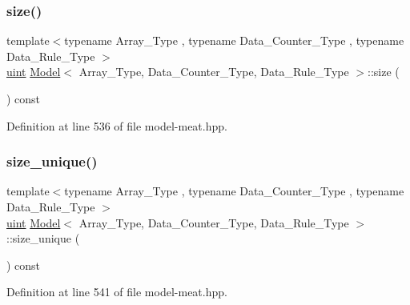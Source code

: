 \mbox{\label{class_model_ab3f157dbb542a48fe5bf412ff7d467fd}} 
\subsubsection{\texorpdfstring{size()}{size()}}
{\footnotesize\ttfamily template$<$typename Array\+\_\+\+Type , typename Data\+\_\+\+Counter\+\_\+\+Type , typename Data\+\_\+\+Rule\+\_\+\+Type $>$ \\
\hyperlink{typedefs_8hpp_a91ad9478d81a7aaf2593e8d9c3d06a14}{uint} \hyperlink{class_model}{Model}$<$ Array\+\_\+\+Type, Data\+\_\+\+Counter\+\_\+\+Type, Data\+\_\+\+Rule\+\_\+\+Type $>$\+::size (\begin{DoxyParamCaption}{ }\end{DoxyParamCaption}) const\hspace{0.3cm}{\ttfamily [inline]}}



Definition at line 536 of file model-\/meat.\+hpp.

\mbox{\label{class_model_a4b5edbe891b6da2319ea3fa6f1aba11d}} 
\subsubsection{\texorpdfstring{size\+\_\+unique()}{size\_unique()}}
{\footnotesize\ttfamily template$<$typename Array\+\_\+\+Type , typename Data\+\_\+\+Counter\+\_\+\+Type , typename Data\+\_\+\+Rule\+\_\+\+Type $>$ \\
\hyperlink{typedefs_8hpp_a91ad9478d81a7aaf2593e8d9c3d06a14}{uint} \hyperlink{class_model}{Model}$<$ Array\+\_\+\+Type, Data\+\_\+\+Counter\+\_\+\+Type, Data\+\_\+\+Rule\+\_\+\+Type $>$\+::size\+\_\+unique (\begin{DoxyParamCaption}{ }\end{DoxyParamCaption}) const\hspace{0.3cm}{\ttfamily [inline]}}



Definition at line 541 of file model-\/meat.\+hpp.

\mbox{\label{class_model_a06a6f52dfc6868908cf11e6663a93904}} 
